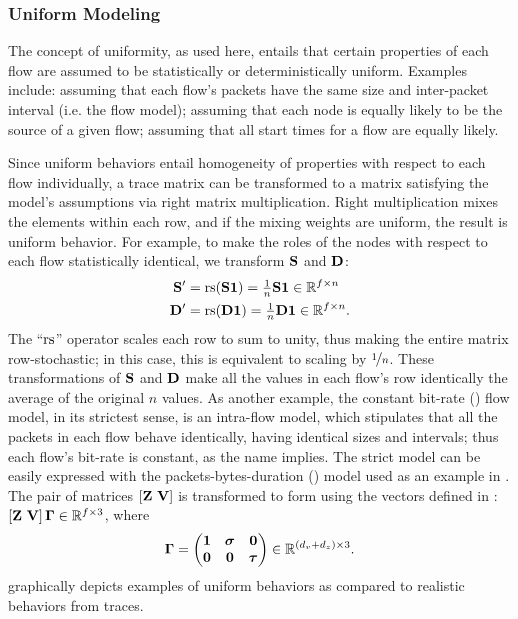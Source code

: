 \documentclass[twocolumn,final]{svjour3}
\begin{document}
\subsubsection{Uniform Modeling}

The concept of uniformity, as used here, entails that certain properties of each flow are assumed to be statistically or deterministically uniform.
Examples include:
assuming that each flow's packets have the same size and inter-packet interval (i.e. the  flow model);
assuming that each node is equally likely to be the source of a given flow; assuming that all start times for a flow are equally likely.

Since uniform behaviors entail homogeneity of properties with respect to each flow individually, a trace matrix can be transformed to a matrix satisfying the model's assumptions via right matrix multiplication.
Right multiplication mixes the elements within each row, and if the mixing weights are uniform, the result is uniform behavior.
For example, to make the roles of the nodes with respect to each flow statistically identical, we transform $\mathbf{S}$ and $\mathbf{D}$:
\begin{align}
\mathbf{S}' &= \text{rs}(\mathbf{S}\mathbf{1}) = {\textstyle{\frac{1}{n}}} \mathbf{S}\mathbf{1} \in \mathbb{R}^{f \times n} \\
\mathbf{D}' &= \text{rs}(\mathbf{D}\mathbf{1}) = {\textstyle{\frac{1}{n}}} \mathbf{D}\mathbf{1}\in \mathbb{R}^{f \times n}.
\end{align}
The ``$\text{rs}$'' operator scales each row to sum to unity, thus making the entire matrix row-stochastic;
in this case, this is equivalent to scaling by $\nicefrac{1}{n}$.
These transformations of $\mathbf{S}$ and $\mathbf{D}$ make all the values in each flow's row identically the average of the original $n$ values.
As another example, the constant bit-rate () flow model, in its strictest sense, is an intra-flow model, which stipulates that all the packets in each flow behave identically, having identical sizes and intervals;
thus each flow's bit-rate is constant, as the name implies.
The strict  model can be easily expressed with the packets-bytes-duration () model used as an example in .
The pair of matrices $[\mathbf{Z}~\mathbf{V}]$ is transformed to  form using the vectors defined in :
$[\mathbf{Z}~\mathbf{V}]\,\mathbf{\Gamma}\in\mathbb{R}^{f \times 3}$, where
\begin{align}
\mat{\Gamma}=\begin{pmatrix}
\ones & \vec{\sigma} & \zeros \\
\zeros & \zeros & \vec{\tau}
\end{pmatrix} \in \R^{(d_v+d_z)\times{3}}.
\end{align}
 graphically depicts examples of uniform behaviors as compared to realistic behaviors from traces.
\end{document}
